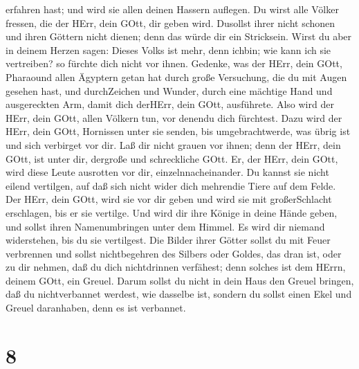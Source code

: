 erfahren hast; und wird sie allen deinen Hassern auflegen. 
Du wirst alle Völker fressen, die der HErr, dein GOtt, dir geben wird.
Dusollst ihrer nicht schonen und ihren Göttern nicht dienen; denn das
würde dir ein Stricksein.  Wirst du aber in deinem Herzen
sagen: Dieses Volks ist mehr, denn ichbin; wie kann ich sie vertreiben?
 so fürchte dich nicht vor ihnen. Gedenke, was der HErr,
dein GOtt, Pharaound allen Ägyptern getan hat  durch große
Versuchung, die du mit Augen gesehen hast, und durchZeichen und Wunder,
durch eine mächtige Hand und ausgereckten Arm, damit dich derHErr, dein
GOtt, ausführete. Also wird der HErr, dein GOtt, allen Völkern tun, vor
denendu dich fürchtest.  Dazu wird der HErr, dein GOtt,
Hornissen unter sie senden, bis umgebrachtwerde, was übrig ist und sich
verbirget vor dir.  Laß dir nicht grauen vor ihnen; denn
der HErr, dein GOtt, ist unter dir, dergroße und schreckliche GOtt.
 Er, der HErr, dein GOtt, wird diese Leute ausrotten vor
dir, einzelnnacheinander. Du kannst sie nicht eilend vertilgen, auf daß
sich nicht wider dich mehrendie Tiere auf dem Felde.  Der
HErr, dein GOtt, wird sie vor dir geben und wird sie mit großerSchlacht
erschlagen, bis er sie vertilge.  Und wird dir ihre Könige
in deine Hände geben, und sollst ihren Namenumbringen unter dem Himmel.
Es wird dir niemand widerstehen, bis du sie vertilgest. 
Die Bilder ihrer Götter sollst du mit Feuer verbrennen und sollst
nichtbegehren des Silbers oder Goldes, das dran ist, oder zu dir nehmen,
daß du dich nichtdrinnen verfähest; denn solches ist dem HErrn, deinem
GOtt, ein Greuel.  Darum sollst du nicht in dein Haus den
Greuel bringen, daß du nichtverbannet werdest, wie dasselbe ist, sondern
du sollst einen Ekel und Greuel daranhaben, denn es ist verbannet.

\hypertarget{section-7}{%
\section{8}\label{section-7}}

